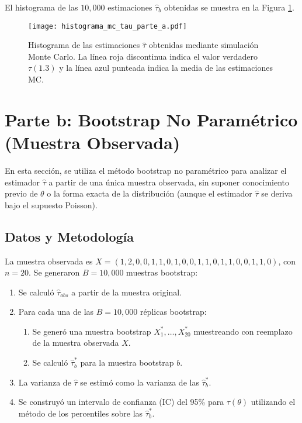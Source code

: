 \documentclass[11pt,a4paper]{article}
\begin{document}
El histograma de las $10,000$ estimaciones $\hat{\tau}_b$ obtenidas se muestra en la Figura \ref{fig:mc_hist_a}.

\begin{figure}[H]
    \centering
    \texttt{[image: histograma\_mc\_tau\_parte\_a.pdf]}
    \caption{Histograma de las estimaciones $\hat{\tau}$ obtenidas mediante simulación Monte Carlo. La línea roja discontinua indica el valor verdadero $\tau(1.3)$ y la línea azul punteada indica la media de las estimaciones MC.}
    \label{fig:mc_hist_a}
\end{figure}



\section{Parte b: Bootstrap No Paramétrico (Muestra Observada)}
En esta sección, se utiliza el método bootstrap no paramétrico para analizar el estimador $\hat{\tau}$ a partir de una única muestra observada, sin suponer conocimiento previo de $\theta$ o la forma exacta de la distribución (aunque el estimador $\hat{\tau}$ se deriva bajo el supuesto Poisson).

\subsection{Datos y Metodología}
La muestra observada es $X = (1, 2, 0, 0, 1, 1, 0, 1, 0, 0, 1, 1, 0, 1, 1, 0, 0, 1, 1, 0)$, con $n=20$.
Se generaron $B=10,000$ muestras bootstrap:
\begin{enumerate}
    \item Se calculó $\hat{\tau}_{obs}$ a partir de la muestra original.
    \item Para cada una de las $B=10,000$ réplicas bootstrap:
    \begin{enumerate}
        \item Se generó una muestra bootstrap $X_1^*, \dots, X_{20}^*$ muestreando con reemplazo de la muestra observada $X$.
        \item Se calculó $\hat{\tau}_b^*$ para la muestra bootstrap $b$.
    \end{enumerate}
    \item La varianza de $\hat{\tau}$ se estimó como la varianza de las $\hat{\tau}_b^*$.
    \item Se construyó un intervalo de confianza (IC) del 95\% para $\tau(\theta)$ utilizando el método de los percentiles sobre las $\hat{\tau}_b^*$.
\end{enumerate}
\end{document}
